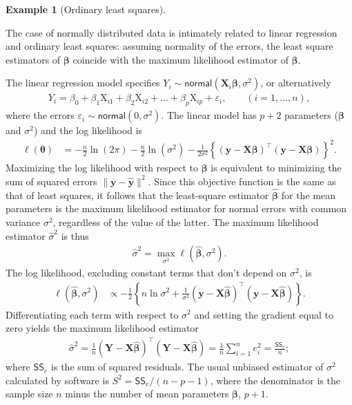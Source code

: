 \documentclass[
  11pt,
  letterpaper,
]{scrbook}
\theoremstyle{definition}
\theoremstyle{definition}
\newtheorem{example}{Example}[chapter]
\theoremstyle{plain}
\theoremstyle{remark}
\begin{document}
\begin{example}[Ordinary least
squares]\protect\hypertarget{exm-ols-mle}{}\label{exm-ols-mle}

The case of normally distributed data is intimately related to linear
regression and ordinary least squares: assuming normality of the errors,
the least square estimators of \(\boldsymbol{\beta}\) coincide with the
maximum likelihood estimator of \(\boldsymbol{\beta}\).

The linear regression model specifies
\(Y_i \sim \mathsf{normal}(\mathbf{X}_i\boldsymbol{\beta}, \sigma^2)\),
or alternatively \begin{align*}
Y_i=\beta_0+\beta_1 \mathrm{X}_{i1}+\beta_2 \mathrm{X}_{i2}+\ldots +\beta_p \mathrm{X}_{ip} + \varepsilon_i, \qquad  (i=1, \ldots, n),
\end{align*} where the errors
\(\varepsilon_i \sim \mathsf{normal}(0, \sigma^2)\). The linear model
has \(p+2\) parameters (\(\boldsymbol{\beta}\) and \(\sigma^2\)) and the
log likelihood is \begin{align*}
\ell(\boldsymbol{\theta})&=-\frac{n}{2} \ln(2\pi)-\frac{n}{2} \ln (\sigma^2) -\frac{1}{2\sigma^2}\left\{(\boldsymbol{y}-\mathbf{X}\boldsymbol{\beta})^\top(\boldsymbol{y}-\mathbf{X}\boldsymbol{\beta})\right\}^2.
\end{align*} Maximizing the log likelihood with respect to
\(\boldsymbol{\beta}\) is equivalent to minimizing the sum of squared
errors \(\|\boldsymbol{y} - \widehat{\boldsymbol{y}}\|^2\). Since this
objective function is the same as that of least squares, it follows that
the least-square estimator \(\widehat{\boldsymbol{\beta}}\) for the mean
parameters is the maximum likelihood estimator for normal errors with
common variance \(\sigma^2\), regardless of the value of the latter. The
maximum likelihood estimator \(\widehat{\sigma}^2\) is thus
\begin{align*}
\widehat{\sigma}^2=\max_{\sigma^2} \ell(\widehat{\boldsymbol{\beta}}, \sigma^2).
\end{align*} The log likelihood, excluding constant terms that don't
depend on \(\sigma^2\), is \begin{align*}
\ell(\widehat{\boldsymbol{\beta}}, \sigma^2)
&\propto-\frac{1}{2}\left\{n\ln\sigma^2+\frac{1}{\sigma^2}(\boldsymbol{y}-\mathbf{X}\hat{\boldsymbol{\beta}})^\top(\boldsymbol{y}-\mathbf{X}\hat{\boldsymbol{\beta}})\right\}.
\end{align*} Differentiating each term with respect to \(\sigma^2\) and
setting the gradient equal to zero yields the maximum likelihood
estimator \begin{align*}
\widehat{\sigma}^2=\frac{1}{n}(\boldsymbol{Y}-\mathbf{X}\hat{\boldsymbol{\beta}})^\top(\boldsymbol{Y}-\mathbf{X}\hat{\boldsymbol{\beta}})= \frac{1}{n} \sum_{i=1}^n e_i^2= \frac{\mathsf{SS}_e}{n};
\end{align*} where \(\mathsf{SS}_e\) is the sum of squared residuals.
The usual unbiased estimator of \(\sigma^2\) calculated by software is
\(S^2=\mathsf{SS}_e/(n-p-1)\), where the denominator is the sample size
\(n\) minus the number of mean parameters \(\boldsymbol{\beta}\),
\(p+1\).

\end{example}
\end{document}

